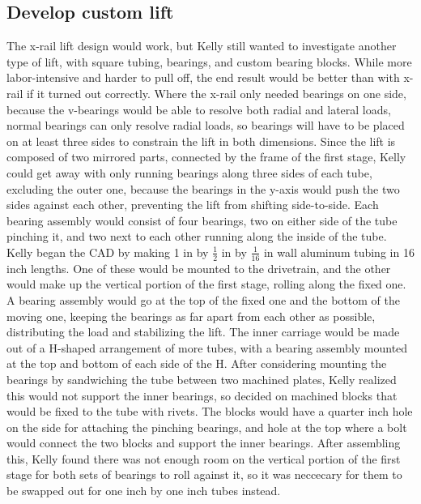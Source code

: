 \documentclass{article}
\begin{document}
\subsection{Develop custom lift}
The x-rail lift design would work, but Kelly still wanted to investigate another type of lift, with square tubing, bearings, and custom bearing blocks. While more labor-intensive and harder to pull off, the end result would be better than with x-rail if it turned out correctly. Where the x-rail only needed bearings on one side, because the v-bearings would be able to resolve both radial and lateral loads, normal bearings can only resolve radial loads, so bearings will have to be placed on at least three sides to constrain the lift in both dimensions. Since the lift is composed of two mirrored parts, connected by the frame of the first stage, Kelly could get away with only running bearings along three sides of each tube, excluding the outer one, because the bearings in the y-axis would push the two sides against each other, preventing the lift from shifting side-to-side. Each bearing assembly would consist of four bearings, two on either side of the tube pinching it, and two next to each other running along the inside of the tube. Kelly began the CAD by making 1 in by $\frac{1}{2}$ in by $\frac{1}{16}$ in wall aluminum tubing in 16 inch lengths. One of these would be mounted to the drivetrain, and the other would make up the vertical portion of the first stage, rolling along the fixed one. A bearing assembly would go at the top of the fixed one and the bottom of the moving one, keeping the bearings as far apart from each other as possible, distributing the load and stabilizing the lift. The inner carriage would be made out of a H-shaped arrangement of more tubes, with a bearing assembly mounted at the top and bottom of each side of the H. After considering mounting the bearings by sandwiching the tube between two machined plates, Kelly realized this would not support the inner bearings, so decided on machined blocks that would be fixed to the tube with rivets. The blocks would have a quarter inch hole on the side for attaching the pinching bearings, and hole at the top where a bolt would connect the two blocks and support the inner bearings. After assembling this, Kelly found there was not enough room on the vertical portion of the first stage for both sets of bearings to roll against it, so it was neccecary for them to be swapped out for one inch by one inch tubes instead. 
\end{document}

